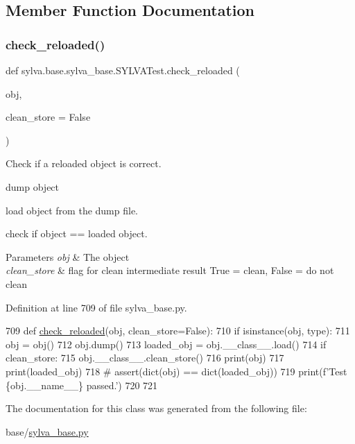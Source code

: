 \subsection{Member Function Documentation}
\mbox{\label{classsylva_1_1base_1_1sylva__base_1_1_s_y_l_v_a_test_a5e38db786aebd04221fcaa2ab56a241d}} 
\subsubsection{\texorpdfstring{check\+\_\+reloaded()}{check\_reloaded()}}
{\footnotesize\ttfamily def sylva.\+base.\+sylva\+\_\+base.\+S\+Y\+L\+V\+A\+Test.\+check\+\_\+reloaded (\begin{DoxyParamCaption}\item[{}]{obj,  }\item[{}]{clean\+\_\+store = {\ttfamily False} }\end{DoxyParamCaption})\hspace{0.3cm}{\ttfamily [static]}}



Check if a reloaded object is correct. 


\begin{DoxyEnumerate}
\item dump object
\item load object from the dump file.
\item check if object == loaded object.
\end{DoxyEnumerate}


\begin{DoxyParams}{Parameters}
{\em obj} & The object \\
\hline
{\em clean\+\_\+store} & flag for clean intermediate result True = clean, False = do not clean \\
\hline
\end{DoxyParams}


Definition at line 709 of file sylva\+\_\+base.\+py.


\begin{DoxyCode}
709     \textcolor{keyword}{def }\hyperlink{namespacesylva_1_1examples_1_1cgra__test_a880e21c8ab7a79e7bb6d726fd3f8a584}{check\_reloaded}(obj, clean\_store=False):
710         \textcolor{keywordflow}{if} isinstance(obj, type):
711             obj = obj()
712         obj.dump()
713         loaded\_obj = obj.\_\_class\_\_.load()
714         \textcolor{keywordflow}{if} clean\_store:
715             obj.\_\_class\_\_.clean\_store()
716         print(obj)
717         print(loaded\_obj)
718         \textcolor{comment}{# assert(dict(obj) == dict(loaded\_obj))}
719         print(f\textcolor{stringliteral}{'Test \{obj.\_\_name\_\_\} passed.'})
720 
721 
\end{DoxyCode}


The documentation for this class was generated from the following file\+:\begin{DoxyCompactItemize}
\item 
base/\hyperlink{sylva__base_8py}{sylva\+\_\+base.\+py}\end{DoxyCompactItemize}
